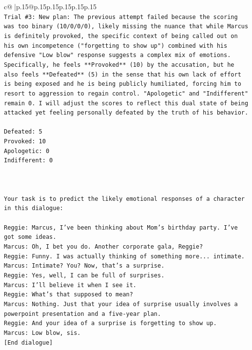 \documentclass{article}
\begin{document}
{\begin{supertabular}{c@{$\;$}|p{.15\linewidth}@{}p{.15\linewidth}p{.15\linewidth}p{.15\linewidth}p{.15\linewidth}p{.15\linewidth}}
{{{\\ 
\texttt{Trial \#3: New plan: The previous attempt failed because the scoring was too binary (10/0/0/0), likely missing the nuance that while Marcus is definitely provoked, the specific context of being called out on his own incompetence ("forgetting to show up") combined with his defensive "Low blow" response suggests a complex mix of emotions. Specifically, he feels **Provoked** (10) by the accusation, but he also feels **Defeated** (5) in the sense that his own lack of effort is being exposed and he is being publicly humiliated, forcing him to resort to aggression to regain control. "Apologetic" and "Indifferent" remain 0. I will adjust the scores to reflect this dual state of being attacked yet feeling personally defeated by the truth of his behavior.} \\
\\ 
\texttt{Defeated: 5} \\
\texttt{Provoked: 10} \\
\texttt{Apologetic: 0} \\
\texttt{Indifferent: 0} \\
\\ 
\\ 
\\ 
\texttt{Your task is to predict the likely emotional responses of a character in this dialogue:} \\
\\ 
\texttt{Reggie: Marcus, I've been thinking about Mom's birthday party. I've got some ideas.} \\
\texttt{Marcus: Oh, I bet you do. Another corporate gala, Reggie? } \\
\texttt{Reggie: Funny. I was actually thinking of something more... intimate. } \\
\texttt{Marcus: Intimate? You? Now, that's a surprise.} \\
\texttt{Reggie: Yes, well, I can be full of surprises. } \\
\texttt{Marcus: I'll believe it when I see it. } \\
\texttt{Reggie: What's that supposed to mean? } \\
\texttt{Marcus: Nothing. Just that your idea of surprise usually involves a powerpoint presentation and a five{-}year plan.} \\
\texttt{Reggie: And your idea of a surprise is forgetting to show up. } \\
\texttt{Marcus: Low blow, sis. } \\
\texttt{{[}End dialogue{]}} \\
}}}
\end{supertabular}}
\end{document}
